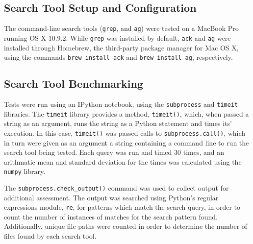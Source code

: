 \documentclass[12pt,letterpaper]{article}
\begin{document}
		\subsection{Search Tool Setup and Configuration}

			The command-line search tools (\texttt{grep},  and \texttt{ag})  were tested on a MacBook Pro running OS X 10.9.2. While \texttt{grep} was installed by default, \texttt{ack} and \texttt{ag} were installed through Homebrew, the third-party package manager for Mac OS X, using the commands \texttt{brew install ack} and \texttt{brew install ag}, respectively. 



		\subsection{Search Tool Benchmarking}
			Tests were run using an IPython notebook, using the \texttt{subprocess} and \texttt{timeit} libraries. The \texttt{timeit} library provides a method, \texttt{timeit()}, which, when passed a string as an argument, runs the string as a Python statement and times its' execution. In this case, \texttt{timeit()} was passed calls to \texttt{subprocess.call()}, which in turn were given as an argument a string containing a command line to run the search tool being tested. Each query was run and timed 30 times, and an arithmatic mean and standard deviation for the times was calculated using the \texttt{numpy} library.

			The \texttt{subprocess.check\_output()} command was used to collect output for additional assessment. The output was searched using Python's regular expressions module, \texttt{re}, for patterns which match the search query, in order to count the number of instances of matches for the search pattern found. Additionally, unique file paths were counted in order to determine the number of files found by each search tool.
\end{document}
